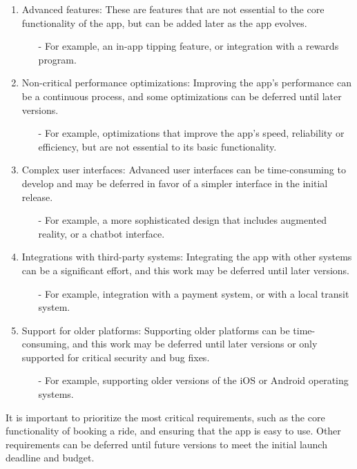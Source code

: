 \documentclass[]{article}
\begin{document}
\begin{enumerate}
	\item Advanced features: These are features that are not essential to the core functionality of the app, but can be added later as the app evolves.
	\begin{itemize}
		\item[-] For example, an in-app tipping feature, or integration with a rewards program. 
	\end{itemize}
	\item Non-critical performance optimizations: Improving the app's performance can be a continuous process, and some optimizations can be deferred until later versions.
	\begin{itemize}
		\item[-] For example, optimizations that improve the app's speed, reliability or efficiency, but are not essential to its basic functionality.  
	\end{itemize}
	\item Complex user interfaces: Advanced user interfaces can be time-consuming to develop and may be deferred in favor of a simpler interface in the initial release. 
	\begin{itemize}
		\item[-] For example, a more sophisticated design that includes augmented reality, or a chatbot interface.  
	\end{itemize}
	\item Integrations with third-party systems: Integrating the app with other systems can be a significant effort, and this work may be deferred until later versions. 
	\begin{itemize}
		\item[-] For example, integration with a payment system, or with a local transit system. 
	\end{itemize}
	\item Support for older platforms: Supporting older platforms can be time-consuming, and this work may be deferred until later versions or only supported for critical security and bug fixes.
	\begin{itemize}
		\item[-] For example, supporting older versions of the iOS or Android operating systems. 
	\end{itemize}
\end{enumerate}

\noindent It is important to prioritize the most critical requirements, such as the core functionality of booking a ride, and ensuring that the app is easy to use. Other requirements can be deferred until future versions to meet the initial launch deadline and budget. 
\end{document}
